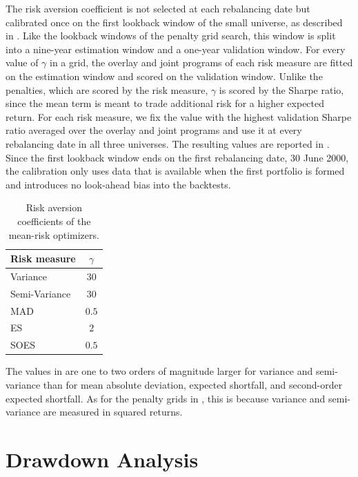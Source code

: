 The risk aversion coefficient is not selected at each rebalancing date but calibrated once on the first lookback
window of the small universe, as described in . Like the lookback windows of the
penalty grid search, this window is split into a nine-year estimation window and a one-year validation window. For
every value of $\gamma$ in a grid, the overlay and joint programs of each risk measure are fitted on the estimation
window and scored on the validation window. Unlike the penalties, which are scored by the risk measure, $\gamma$ is
scored by the Sharpe ratio, since the mean term is meant to trade additional risk for a higher expected return. For
each risk measure, we fix the value with the highest validation Sharpe ratio averaged over the overlay and joint
programs and use it at every rebalancing date in all three universes. The resulting values are reported in
. Since the first lookback window ends on the first rebalancing date, 30 June 2000, the
calibration only uses data that is available when the first portfolio is formed and introduces no look-ahead bias into
the backtests.

\begin{table}[!htbp]
\centering
\small
\begin{tabular}{lc}
\toprule
Risk measure  & $\gamma$ \\
\midrule
Variance      & $30$ \\
Semi-Variance & $30$ \\
MAD           & $0.5$ \\
ES            & $2$ \\
SOES          & $0.5$ \\
\bottomrule
\end{tabular}
\caption{Risk aversion coefficients of the mean-risk optimizers.}
\label{tab:risk-aversion}
\end{table}

The values in  are one to two orders of magnitude larger for variance and semi-variance than
for mean absolute deviation, expected shortfall, and second-order expected shortfall. As for the penalty grids in
, this is because variance and semi-variance are measured in squared returns.

\newpage
\section{Drawdown Analysis} \label{app:drawdown-analysis}

